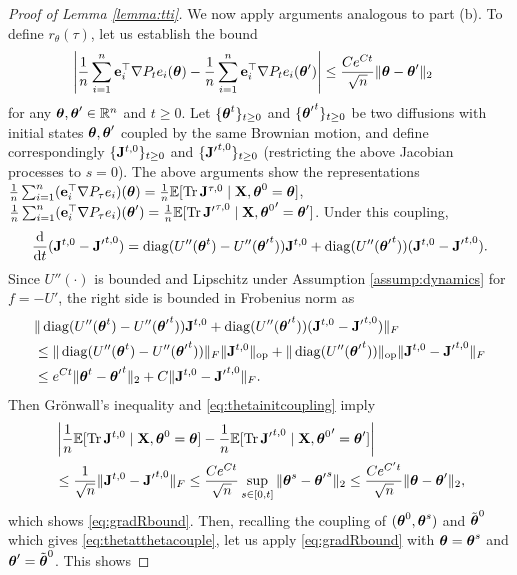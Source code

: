\begin{proof}[Proof of Lemma \ref{lemma:tti}]
We now apply arguments analogous to part (b).
To define $r_\theta(\tau)$, let us establish the bound
\begin{align}
\left|\frac{1}{n}\sum_{i=1}^n \mathbf{e}_i^\top \nabla P_t e_i(\boldsymbol{\theta})
-\frac{1}{n}\sum_{i=1}^n \mathbf{e}_i^\top \nabla P_t e_i({\boldsymbol{\theta}'})\right|
&\leq
\frac{Ce^{Ct}}{\sqrt{n}}\|\boldsymbol{\theta}-{\boldsymbol{\theta}'}\|_2\label{eq:gradRbound}
\end{align}
for any $\boldsymbol{\theta},{\boldsymbol{\theta}'} \in \mathbb{R}^n$ and $t \geq 0$.
Let $\{\boldsymbol{\theta}^t\}_{t \geq 0}$ and
$\{{\boldsymbol{\theta}'}^t\}_{t \geq 0}$ be two diffusions with initial states
$\boldsymbol{\theta},\boldsymbol{\theta}'$ coupled by the same Brownian motion, and define
correspondingly $\{{\mathbf{J}}^{t,0}\}_{t \geq 0}$ and $\{{\mathbf{J}'}^{t,0}\}_{t \geq 0}$
(restricting the above Jacobian processes to $s=0$).
The above arguments show the representations
$\frac{1}{n}\sum_{i=1}^n (\mathbf{e}_i^\top \nabla P_\tau e_i)(\boldsymbol{\theta})
=\frac{1}{n}\mathbb{E}[\operatorname{Tr} \mathbf{J}^{\tau,0} \mid \mathbf{X},\boldsymbol{\theta}^0=\boldsymbol{\theta}]$,
$\frac{1}{n}\sum_{i=1}^n (\mathbf{e}_i^\top \nabla P_\tau e_i)({\boldsymbol{\theta}'})
=\frac{1}{n}\mathbb{E}[\operatorname{Tr} {\mathbf{J}'}^{\tau,0} \mid \mathbf{X},{\boldsymbol{\theta}^0}'=\boldsymbol{\theta}']$.
Under this coupling,
\[\frac{\mathrm{d}}{\mathrm{d} t}(\mathbf{J}^{t,0}-{\mathbf{J}'}^{t,0})
=\operatorname{diag}(U''(\boldsymbol{\theta}^t)-U''({\boldsymbol{\theta}'}^t))\mathbf{J}^{t,0}
+\operatorname{diag}(U''({\boldsymbol{\theta}'}^t))(\mathbf{J}^{t,0}-{\mathbf{J}'}^{t,0}).\]
Since $U''(\cdot)$ is bounded and Lipschitz under Assumption
\ref{assump:dynamics} for $f=-U'$,
the right side is bounded in Frobenius norm as
\begin{align*}
&\|\operatorname{diag}(U''(\boldsymbol{\theta}^t)-U''({\boldsymbol{\theta}'}^t))\mathbf{J}^{t,0}
+\operatorname{diag}(U''({\boldsymbol{\theta}'}^t))(\mathbf{J}^{t,0}-{\mathbf{J}'}^{t,0})\|_F\\
&\leq \|\operatorname{diag}(U''(\boldsymbol{\theta}^t)-U''({\boldsymbol{\theta}'}^t))\|_F \|\mathbf{J}^{t,0}\|_{\mathrm{op}}
+\|\operatorname{diag}(U''({\boldsymbol{\theta}'}^t))\|_{\mathrm{op}}\|\mathbf{J}^{t,0}-{\mathbf{J}'}^{t,0}\|_F\\
&\leq e^{Ct}\|\boldsymbol{\theta}^t-{\boldsymbol{\theta}'}^t\|_2+C\|\mathbf{J}^{t,0}-{\mathbf{J}'}^{t,0}\|_F.
\end{align*}
Then Gr\"onwall's inequality and \eqref{eq:thetainitcoupling} imply
\begin{align*}
&\left|\frac{1}{n}\mathbb{E}[\operatorname{Tr} \mathbf{J}^{t,0} \mid \mathbf{X},\boldsymbol{\theta}^0=\boldsymbol{\theta}]-
\frac{1}{n}\mathbb{E}[\operatorname{Tr} {\mathbf{J}'}^{t,0} \mid \mathbf{X},{\boldsymbol{\theta}^0}'=\boldsymbol{\theta}']\right|\\
&\leq \frac{1}{\sqrt{n}} \|\mathbf{J}^{t,0}-{\mathbf{J}'}^{t,0}\|_F
\leq \frac{Ce^{Ct}}{\sqrt{n}} \sup_{s \in [0,t]} \|\boldsymbol{\theta}^s-{\boldsymbol{\theta}'}^s\|_2
\leq \frac{Ce^{C't}}{\sqrt{n}}\|\boldsymbol{\theta}-{\boldsymbol{\theta}'}\|_2,
\end{align*}
which shows \eqref{eq:gradRbound}. Then, recalling the coupling of
$(\boldsymbol{\theta}^0,\boldsymbol{\theta}^s)$ and $\tilde{\boldsymbol{\theta}}^0$ which 
gives \eqref{eq:thetatthetacouple}, let us apply \eqref{eq:gradRbound}
with $\boldsymbol{\theta}=\boldsymbol{\theta}^s$ and $\boldsymbol{\theta}'=\tilde{\boldsymbol{\theta}}^0$. This shows

\end{proof}
